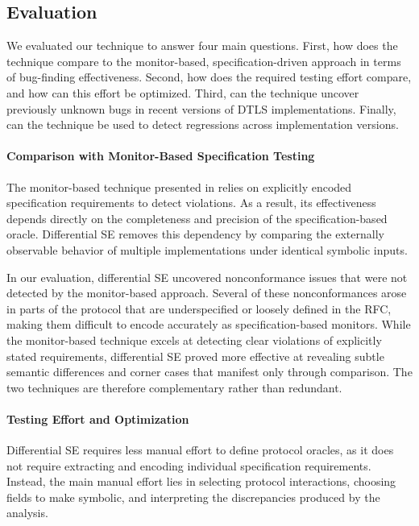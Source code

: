 \subsection{Evaluation}
We evaluated our technique to answer four main questions.
First, how does the technique compare to the monitor-based, specification-driven approach in terms of bug-finding effectiveness.
Second, how does the required testing effort compare, and how can this effort be optimized.
Third, can the technique uncover previously unknown bugs in recent versions of DTLS implementations.
Finally, can the technique be used to detect regressions across implementation versions.

\paragraph{Comparison with Monitor-Based Specification Testing}
The monitor-based technique presented in  relies on explicitly encoded specification requirements to detect violations.
As a result, its effectiveness depends directly on the completeness and precision of the specification-based oracle.
Differential SE removes this dependency by comparing the externally observable behavior of multiple implementations under identical symbolic inputs.

In our evaluation, differential SE uncovered nonconformance issues that were not detected by the monitor-based approach.
Several of these nonconformances arose in parts of the protocol that are underspecified or loosely defined in the RFC, making them difficult to encode accurately as specification-based monitors.
While the monitor-based technique excels at detecting clear violations of explicitly stated requirements, differential SE proved more effective at revealing subtle semantic differences and corner cases that manifest only through comparison.
The two techniques are therefore complementary rather than redundant.

\paragraph{Testing Effort and Optimization}
Differential SE requires less manual effort to define protocol oracles, as it does not require extracting and encoding individual specification requirements.
Instead, the main manual effort lies in selecting protocol interactions, choosing fields to make symbolic, and interpreting the discrepancies produced by the analysis.

